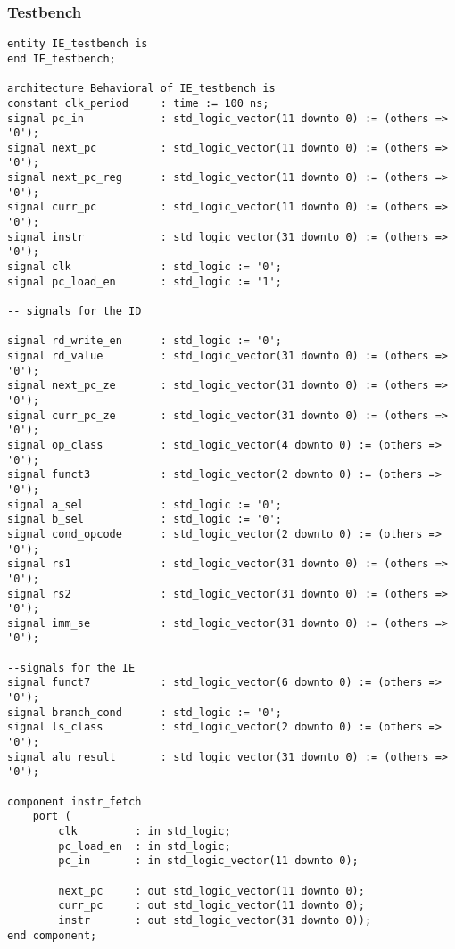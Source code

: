 \subsubsection{Testbench}
\begin{code}
\label{code:IE_TB}  
\begin{verbatim}
entity IE_testbench is
end IE_testbench;

architecture Behavioral of IE_testbench is
constant clk_period     : time := 100 ns;
signal pc_in            : std_logic_vector(11 downto 0) := (others => '0');
signal next_pc          : std_logic_vector(11 downto 0) := (others => '0');
signal next_pc_reg      : std_logic_vector(11 downto 0) := (others => '0');
signal curr_pc          : std_logic_vector(11 downto 0) := (others => '0');
signal instr            : std_logic_vector(31 downto 0) := (others => '0');
signal clk              : std_logic := '0';
signal pc_load_en       : std_logic := '1';

-- signals for the ID

signal rd_write_en      : std_logic := '0';
signal rd_value         : std_logic_vector(31 downto 0) := (others => '0');
signal next_pc_ze       : std_logic_vector(31 downto 0) := (others => '0');
signal curr_pc_ze       : std_logic_vector(31 downto 0) := (others => '0');
signal op_class         : std_logic_vector(4 downto 0) := (others => '0');
signal funct3           : std_logic_vector(2 downto 0) := (others => '0');
signal a_sel            : std_logic := '0';
signal b_sel            : std_logic := '0';
signal cond_opcode      : std_logic_vector(2 downto 0) := (others => '0');
signal rs1              : std_logic_vector(31 downto 0) := (others => '0');
signal rs2              : std_logic_vector(31 downto 0) := (others => '0');
signal imm_se           : std_logic_vector(31 downto 0) := (others => '0');

--signals for the IE
signal funct7           : std_logic_vector(6 downto 0) := (others => '0');
signal branch_cond      : std_logic := '0';
signal ls_class         : std_logic_vector(2 downto 0) := (others => '0');
signal alu_result       : std_logic_vector(31 downto 0) := (others => '0');

component instr_fetch
    port ( 
        clk         : in std_logic;
        pc_load_en  : in std_logic;
        pc_in       : in std_logic_vector(11 downto 0);
        
        next_pc     : out std_logic_vector(11 downto 0);
        curr_pc     : out std_logic_vector(11 downto 0);
        instr       : out std_logic_vector(31 downto 0));
end component;


\end{verbatim}
\end{code}
